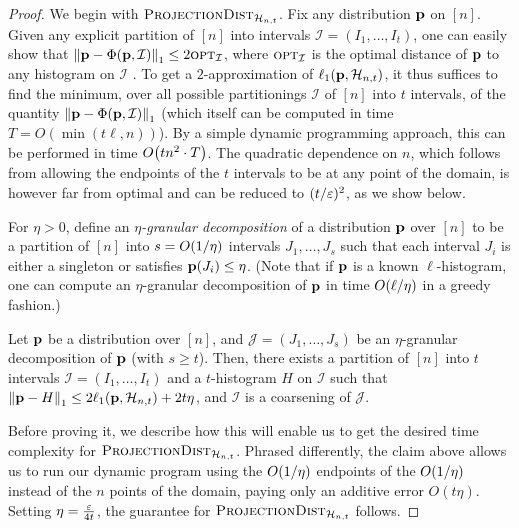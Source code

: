 \begin{proof}
We begin with $\estimdist[\classhist]$. Fix any distribution $\D$ on $[n]$. Given any explicit partition of $[n]$ into intervals $\mathcal{I}=(I_1,\dots,I_t)$, one can easily show that $\normone{\D - \Phi(\D,\mathcal{I})} \leq 2\opt_{\mathcal{I}}$, where $\opt_{\mathcal{I}}$ is the optimal distance of $\D$ to any histogram on $\mathcal{I}$ . To get a $2$-approximation of $\lp[1](\D,\classhist)$, it thus suffices to find the minimum, over all possible partitionings $\mathcal{I}$ of $[n]$ into $t$ intervals, of the quantity $\normone{\D - \Phi(\D,\mathcal{I})}$ (which itself can be computed in time $T=O(\min(t\ell,n))$). By a simple dynamic programming approach, this can be performed in time $\bigO{t n^2 \cdot T}$. The quadratic dependence on $n$, which follows from allowing the endpoints of the $t$ intervals to be at any point of the domain, is however far from optimal and can be reduced to $(t/\eps)^2$, as we show below.

For $\eta > 0$, define an \emph{$\eta$-granular decomposition} of a distribution $\D$ over $[n]$ to be a partition of $[n]$ into $s=\bigO{1/\eta}$ intervals $J_1,\dots,J_s$ such that each interval $J_i$ is either a singleton or satisfies $\D(J_i) \leq \eta$. (Note that if $\D$ is a known $\ell$-histogram, one can compute an $\eta$-granular decomposition of $\D$ in time $\bigO{\ell/\eta}$ in a greedy fashion.)

\begin{claim}\label{claim:granularity:piecewise:projection}
Let $\D$ be a distribution over $[n]$, and $\mathcal{J} = (J_1,\dots,J_s)$ be an $\eta$-granular decomposition of $\D$ (with $s\geq t$). Then, there exists a partition of $[n]$ into $t$ intervals $\mathcal{I}=(I_1,\dots,I_t)$ and a $t$-histogram $H$ on $\mathcal{I}$ such that $\normone{\D - H} \leq 2\lp[1](\D,\classhist[t])+2t\eta$, and $\mathcal{I}$ is a coarsening of $\mathcal{J}$.
\end{claim}
Before proving it, we describe how this will enable us to get the desired time complexity for $\estimdist[\classhist]$. Phrased differently, the claim above allows us to run our dynamic program using the $\bigO{1/\eta}$ endpoints of the $\bigO{1/\eta}$ instead of the $n$ points of the domain, paying only an additive error $O(t\eta)$. Setting $\eta=\frac{\eps}{4t}$, the guarantee for $\estimdist[\classhist]$ follows.


\end{proof}
